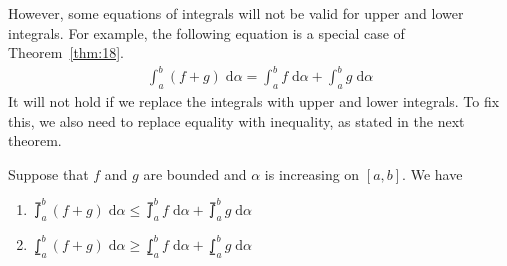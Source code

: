 \documentclass[thmcnt=section, 12pt]{my-elegantbook}
\begin{document}

However, some equations of integrals will not be valid for upper and lower integrals. For example, the following equation is a special case of Theorem~\ref{thm:18}.
\begin{align*}
    \int_{a}^{b} (f+g) \; \mathrm{d}\alpha
    = \int_{a}^{b} f \; \mathrm{d}\alpha
    + \int_{a}^{b} g \; \mathrm{d}\alpha
\end{align*}
It will not hold if we replace the integrals with upper and lower integrals. To fix this, we also need to replace equality with inequality, as stated in the next theorem. 

\begin{theorem}
    Suppose that $f$ and $g$ are bounded and $\alpha$ is increasing on $[a, b]$. We have 
    \begin{enumerate}
        \item $\upint_a^b (f+g) \; \mathrm{d}\alpha \leq \upint_a^b f \; \mathrm{d}\alpha + \upint_a^b g \; \mathrm{d}\alpha$
        \item $\lowint_a^b (f+g) \; \mathrm{d}\alpha \geq \lowint_a^b f \; \mathrm{d}\alpha + \lowint_a^b g \; \mathrm{d}\alpha$
    \end{enumerate}
\end{theorem}
\end{document}
